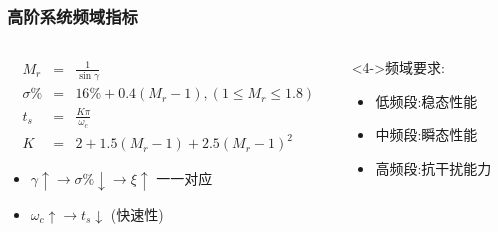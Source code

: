 \documentclass[table]{beamer}
\begin{document}
\begin{frame}
\frametitle{高阶系统频域指标}
\label{sec-3-4}
\begin{columns}
\begin{column}{0.7\textwidth}
\label{sec-3-4-1}

\begin{eqnarray*}
M_r & = & \frac{1}{\sin\gamma}\\
\sigma\% &=& 16\%+0.4(M_r-1), (1\leq M_r\leq 1.8) \\
t_s &=& \frac{K\pi}{\omega_c}\\
K&=& 2+1.5(M_r-1)+2.5(M_r-1)^2 
\end{eqnarray*}

\begin{itemize}
\item <2->$\gamma\uparrow \rightarrow \sigma\%\downarrow \rightarrow \xi\uparrow$  一一对应
\item <3->$\omega_c\uparrow \rightarrow t_s\downarrow$ (快速性)
\end{itemize}
\end{column}
\begin{column}{0.3\textwidth}
\begin{block}<4->{频域要求:}
\label{sec-3-4-2}

\begin{itemize}
\item 低频段:稳态性能
\item 中频段:瞬态性能
\item 高频段:抗干扰能力
\end{itemize}
\end{block}
\end{column}
\end{columns}
\end{frame}
\end{document}
